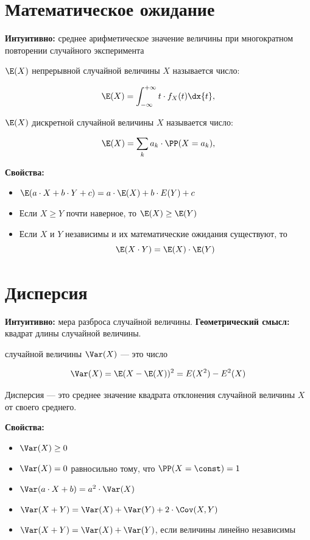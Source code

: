 \documentclass[12pt, a4paper, oneside]{article}
\begin{document}
\section{Математическое ожидание}

\textbf{Интуитивно:} среднее арифметическое значение величины при многократном повторении случайного эксперимента

 $\E(X)$ непрерывной случайной величины $X$ называется число:

$$
\E(X) = \int_{-\infty}^{+\infty} t \cdot f_X(t)  \dx{t}, 
$$ 

 $\E(X)$ дискретной случайной величины $X$  называется число:

$$
\E(X) = \sum\limits_{k} a_k \cdot \PP(X = a_k),
$$ 

\textbf{Свойства:}

\begin{itemize}
\item $\E(a \cdot  X + b \cdot Y + c) = a \cdot \E(X) + b \cdot E(Y) + c$
\item Если $X \geq Y$ почти наверное, то $\E(X) \geq \E(Y)$
\item Если $X$ и $Y$ независимы и их математические ожидания существуют, то $$\E(X \cdot Y) = \E(X) \cdot \E(Y)$$
\end{itemize}


\section{Дисперсия}

\textbf{Интуитивно:} мера разброса случайной величины. \textbf{Геометрический смысл:} квадрат длины случайной величины.

 случайной величины $\Var(X)$ --- это число 

$$
\Var(X) = \E(X - \E(X))^2 =  E(X^2) - E^2(X)
$$

Дисперсия --- это среднее значение квадрата отклонения случайной величины $X$ от своего среднего.

\textbf{Свойства:}

\begin{itemize}
\item $\Var(X) \ge 0$
\item $\Var(X) = 0$ равносильно тому, что $\PP(X=\const)=1$
\item $\Var(a \cdot X + b) = a^2 \cdot \Var(X)$
\item $\Var(X + Y) = \Var(X) + \Var(Y) + 2\cdot \Cov(X,Y)$
\item $\Var(X + Y) = \Var(X) + \Var(Y)$, если величины линейно независимы
\end{itemize}
\end{document}
